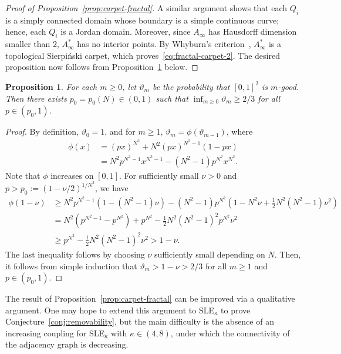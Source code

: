 \documentclass[a4paper]{article}
\numberwithin{equation}{section}
\newtheorem{proposition}[theorem]{Proposition}
\numberwithin{equation}{section}
\renewcommand{\1}{\mathbf{1}}
\begin{document}
\begin{proof}[Proof of Proposition~\ref{prop:carpet-fractal}]
    A similar argument shows that each $Q_i$ is a simply connected domain whose boundary is a simple continuous curve; hence, each $Q_i$ is a Jordan domain. Moreover, since $A_\infty$ has Hausdorff dimension smaller than 2, $A_\infty^*$ has no interior points. By Whyburn's criterion~\cite{Whyburn-carpet}, $A_\infty^*$ is a topological Sierpi\'nski carpet, which proves~\eqref{eq:fractal-carpet-2}. The desired proposition now follows from Proposition~\ref{prop:fractal-rsw} below.
\end{proof}

\begin{proposition}\label{prop:fractal-rsw}
    For each $m \ge 0$, let $\vartheta_m$ be the probability that $[0,1]^2$ is $m$-good. Then there exists $p_0=p_0(N) \in (0,1)$ such that $\inf_{m \ge 0} \vartheta_m \ge 2/3$ for all $p \in (p_0,1)$.
\end{proposition}

\begin{proof}
    By definition, $\vartheta_0=1$, and for $m \ge 1$, $\vartheta_m=\phi(\vartheta_{m-1})$, where
    \begin{align*}
        \phi(x)&=(px)^{N^2}+N^2(px)^{N^2-1}(1-px) \\
        &=N^2 p^{N^2-1} x^{N^2-1}-(N^2-1) p^{N^2} x^{N^2}.
    \end{align*}
    Note that $\phi$ increases on $[0,1]$. For sufficiently small $\nu>0$ and $p>p_0:=(1-\nu/2)^{1/N^2}$, we have
    \begin{align*}
        \phi(1-\nu) &\ge N^2 p^{N^2-1}(1-(N^2-1)\nu)-(N^2-1) p^{N^2}(1-N^2\nu+\tfrac{1}{2}N^2(N^2-1)\nu^2) \\
        &=N^2(p^{N^2-1}-p^{N^2})+p^{N^2}-\tfrac{1}{2} N^2(N^2-1)^2 p^{N^2} \nu^2 \\
        &\ge p^{N^2}-\tfrac{1}{2} N^2(N^2-1)^2 \nu^2>1-\nu.
    \end{align*}
    The last inequality follows by choosing $\nu$ sufficiently small depending on $N$. Then, it follows from simple induction that $\vartheta_m>1-\nu>2/3$ for all $m \ge 1$ and $p \in (p_0,1)$.
\end{proof}

The result of Proposition~\ref{prop:carpet-fractal} can be improved via a qualitative argument. One may hope to extend this argument to SLE$_\kappa$ to prove Conjecture~\ref{conj:removability}, but the main difficulty is the absence of an increasing coupling for SLE$_\kappa$ with $\kappa \in (4,8)$, under which the connectivity of the adjacency graph is decreasing.
\end{document}
